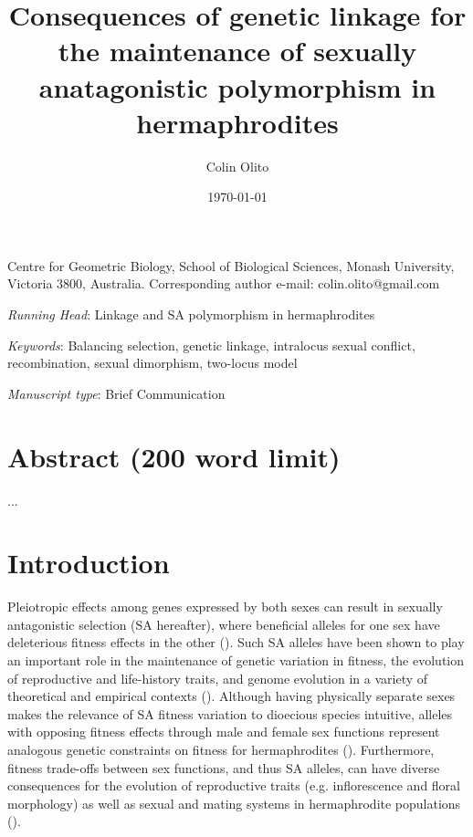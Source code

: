 \documentclass{article}
\title{Consequences of genetic linkage for the maintenance of sexually anatagonistic polymorphism in hermaphrodites}
\author{Colin Olito}
\date{\today}
\begin{document}
\maketitle


\noindent{} Centre for Geometric Biology, School of Biological Sciences, Monash University, Victoria 3800, Australia.
\noindent{} Corresponding author e-mail: colin.olito@gmail.com

\bigskip

\noindent{} \textit{Running Head}: Linkage and SA polymorphism in hermaphrodites

\bigskip

\noindent{} \textit{Keywords}: Balancing selection, genetic linkage, intralocus sexual conflict, recombination, sexual dimorphism, two-locus model

\bigskip

\noindent{} \textit{Manuscript type}: Brief Communication

\bigskip


\linenumbers
\modulolinenumbers[1]
\renewcommand\linenumberfont{\normalfont\small}


\newpage{}
\section*{Abstract (200 word limit)}

\noindent{} ...

\newpage{}


\section*{Introduction}

Pleiotropic effects among genes expressed by both sexes can result in sexually antagonistic selection (SA hereafter), where beneficial alleles for one sex have deleterious fitness effects in the other (\citealt{Kidwell1977, Rice1992, ConnClark2012}). Such SA alleles have been shown to play an important role in the maintenance of genetic variation in fitness, the evolution of reproductive and life-history traits, and genome evolution in a variety of theoretical and empirical contexts (\citealt{Barson2015, BondChen2009, CoxCals2010, CharlesworthHughes1999, ConnClark2012, Fry2010, Prout2000, Rice1992, RiceChipp2001}). Although having physically separate sexes makes the relevance of SA fitness variation to dioecious species intuitive, alleles with opposing fitness effects through male and female sex functions represent analogous genetic constraints on fitness for hermaphrodites (\citealt{Abbott2011, JordanConn2014}). Furthermore, fitness trade-offs between sex functions, and thus SA alleles, can have diverse consequences for the evolution of reproductive traits (e.g. inflorescence and floral morphology) as well as sexual and mating systems in hermaphrodite populations (\citealt{LloydWebb1986,WebbLloyd1986, Barrett2002, Abbott2011}).
\end{document}

